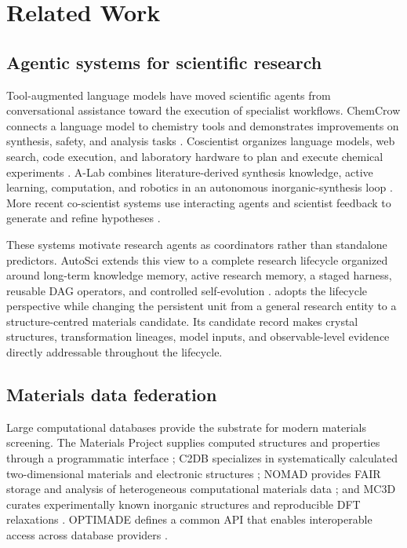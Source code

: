 \section{Related Work}
\label{sec:related}

\subsection{Agentic systems for scientific research}

Tool-augmented language models have moved scientific agents from conversational assistance toward the execution of specialist workflows.  ChemCrow connects a language model to chemistry tools and demonstrates improvements on synthesis, safety, and analysis tasks \cite{bran2024chemcrow}.  Coscientist organizes language models, web search, code execution, and laboratory hardware to plan and execute chemical experiments \cite{boiko2023coscientist}.  A-Lab combines literature-derived synthesis knowledge, active learning, computation, and robotics in an autonomous inorganic-synthesis loop \cite{szymanski2023alab}.  More recent co-scientist systems use interacting agents and scientist feedback to generate and refine hypotheses \cite{gottweis2026coscientist}.

These systems motivate research agents as coordinators rather than standalone predictors.  AutoSci extends this view to a complete research lifecycle organized around long-term knowledge memory, active research memory, a staged harness, reusable DAG operators, and controlled self-evolution \cite{qian2026autosci}.  \system adopts the lifecycle perspective while changing the persistent unit from a general research entity to a structure-centred materials candidate.  Its candidate record makes crystal structures, transformation lineages, model inputs, and observable-level evidence directly addressable throughout the lifecycle.

\subsection{Materials data federation}

Large computational databases provide the substrate for modern materials screening.  The Materials Project supplies computed structures and properties through a programmatic interface \cite{jain2013materials}; C2DB specializes in systematically calculated two-dimensional materials and electronic structures \cite{haastrup2018c2db}; NOMAD provides FAIR storage and analysis of heterogeneous computational materials data \cite{sbailo2022nomad}; and MC3D curates experimentally known inorganic structures and reproducible DFT relaxations \cite{huber2026mc3d}.  OPTIMADE defines a common API that enables interoperable access across database providers \cite{andersen2021optimade}.

